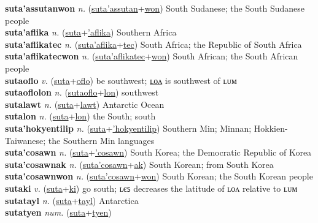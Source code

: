 \textbf{suta'assutanwon} \textit{n.} (\hyperref[suta'assutan]{suta'assutan}+\hyperref[won]{won})
South Sudanese; the South Sudanese people \label{suta'assutanwon} \\
\textbf{suta'aflika} \textit{n.} (\hyperref[suta]{suta}+\hyperref['aflika]{'aflika})
Southern Africa \label{suta'aflika} \\
\textbf{suta'aflikatec} \textit{n.} (\hyperref[suta'aflika]{suta'aflika}+\hyperref[tec]{tec})
South Africa; the Republic of South Africa \label{suta'aflikatec} \\
\textbf{suta'aflikatecwon} \textit{n.} (\hyperref[suta'aflikatec]{suta'aflikatec}+\hyperref[won]{won})
South African; the South African people \label{suta'aflikatecwon} \\
\textbf{sutaoflo} \textit{v.} (\hyperref[suta]{suta}+\hyperref[oflo]{oflo})
be southwest; \hyperref[sutaoflolon]{ʟᴏᴧ} is southwest of ʟᴜᴍ \label{sutaoflo} \\
\textbf{sutaoflolon} \textit{n.} (\hyperref[sutaoflo]{sutaoflo}+\hyperref[lon]{lon})
southwest \label{sutaoflolon} \\
\textbf{sutalawt} \textit{n.} (\hyperref[suta]{suta}+\hyperref[lawt]{lawt})
Antarctic Ocean \label{sutalawt} \\
\textbf{sutalon} \textit{n.} (\hyperref[suta]{suta}+\hyperref[lon]{lon})
the South; south \label{sutalon} \\
\textbf{suta'hokyentilip} \textit{n.} (\hyperref[suta]{suta}+\hyperref['hokyentilip]{'hokyentilip})
Southern Min; Minnan; Hokkien-Taiwanese; the Southern Min languages \label{suta'hokyentilip} \\
\textbf{suta'cosawn} \textit{n.} (\hyperref[suta]{suta}+\hyperref['cosawn]{'cosawn})
South Korea; the Democratic Republic of Korea \label{suta'cosawn} \\
\textbf{suta'cosawnak} \textit{n.} (\hyperref[suta'cosawn]{suta'cosawn}+\hyperref[ak]{ak})
South Korean; from South Korea \label{suta'cosawnak} \\
\textbf{suta'cosawnwon} \textit{n.} (\hyperref[suta'cosawn]{suta'cosawn}+\hyperref[won]{won})
South Korean; the South Korean people \label{suta'cosawnwon} \\
\textbf{sutaki} \textit{v.} (\hyperref[suta]{suta}+\hyperref[ki]{ki})
go south; ʟєꜱ decreases the latitude of ʟᴏᴧ relative to ʟᴜᴍ \label{sutaki} \\
\textbf{sutatayl} \textit{n.} (\hyperref[suta]{suta}+\hyperref[tayl]{tayl})
Antarctica \label{sutatayl} \\
\textbf{sutatyen} \textit{num.} (\hyperref[suta]{suta}+\hyperref[tyen]{tyen})
